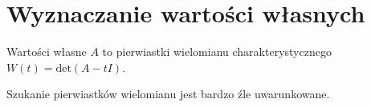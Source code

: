 \section{Wyznaczanie wartości własnych}
Wartości własne \( A \) to pierwiastki wielomianu charakterystycznego \( W(t) = \text{det}(A - tI) \). \\
\begin{warning}
    Szukanie pierwiastków wielomianu jest bardzo źle uwarunkowane.
\end{warning}
